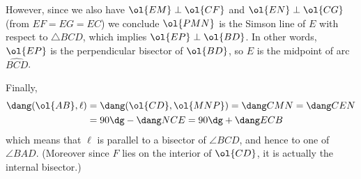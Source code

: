 However, since we also have $\ol{EM} \perp \ol{CF}$
and $\ol{EN} \perp \ol{CG}$ (from $EF=EG=EC$)
we conclude $\ol{PMN}$ is the Simson line of $E$ with respect to $\triangle BCD$,
which implies $\ol{EP} \perp \ol{BD}$.
In other words, $\ol{EP}$ is the perpendicular bisector of $\ol{BD}$,
so $E$ is the midpoint of arc $\widehat{BCD}$.

Finally,
\begin{align*}
  \dang(\ol{AB}, \ell) &= \dang(\ol{CD}, \ol{MNP}) = \dang CMN = \dang CEN \\
  &= 90\dg - \dang NCE = 90\dg + \dang ECB
\end{align*}
which means that $\ell$ is parallel to a bisector of $\angle BCD$,
and hence to one of $\angle BAD$.
(Moreover since $F$ lies on the interior of $\ol{CD}$,
it is actually the internal bisector.)
